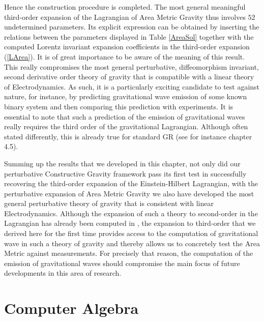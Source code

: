\documentclass[a4paper,12pt, DIV=14, BCOR=5mm, twoside, headsepline, numbers=noenddot]{scrbook}
\begin{document}
Hence the construction procedure is completed. The most general meaningful third-order expansion of the Lagrangian of Area Metric Gravity thus involves $52$ undetermined parameters. Its explicit expression can be obtained by inserting the relations between the parameters displayed in Table \ref{AreaSol} together with the computed Lorentz invariant expansion coefficients in the third-order expansion (\ref{LArea}). It is of great importance to be aware of the meaning of this result. This really compromises the most general perturbative, diffeomorphism invariant, second derivative order theory of gravity that is compatible with a linear theory of Electrodynamics. As such, it is a particularly exciting candidate to test against nature, for instance, by predicting gravitational wave emission of some known binary system and then comparing this prediction with experiments. It is essential to note that such a prediction of the emission of gravitational waves really requires the third order of the gravitational Lagrangian. Although often stated differently, this is already true for standard GR (see for instance \cite{1984grra.book.....S} chapter 4.5).

Summing up the results that we developed in this chapter, not only did our perturbative Constructive Gravity framework pass its first test in successfully recovering the third-order expansion of the Einstein-Hilbert Lagrangian, with the perturbative expansion of Area Metric Gravity we also have developed the most general perturbative theory of gravity that is consistent with linear Electrodynamics. Although the expansion of such a theory to second-order in the Lagrangian has already been computed in \cite{2017arXiv170803870S}, the expansion to third-order that we derived here for the first time provides access to the computation of gravitational wave in such a theory of gravity and thereby allows us to concretely test the Area Metric against measurements. For precisely that reason, the computation of the emission of gravitational waves should compromise the main focus of future developments in this area of research. 

\chapter{Computer Algebra}\label{computerAlg}
\end{document}
